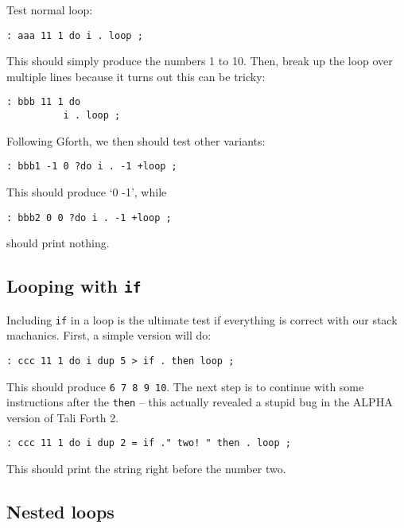 Test normal loop:
\begin{lstlisting}[frame=lines]
        : aaa 11 1 do i . loop ;        
\end{lstlisting}

\noindent This should simply produce the numbers 1 to 10. Then, break up the
loop over multiple lines because it turns out this can be tricky:

\begin{lstlisting}[frame=lines]
        : bbb 11 1 do 
          i . loop ; 
\end{lstlisting}

\noindent Following Gforth, we then should test other variants:

\begin{lstlisting}[frame=lines]
        : bbb1 -1 0 ?do i . -1 +loop ;
\end{lstlisting}

\noindent This should produce `0 -1', while

\begin{lstlisting}[frame=lines]
        : bbb2 0 0 ?do i . -1 +loop ;
\end{lstlisting}

\noindent should print nothing.

\subsection{Looping with \texttt{if}}

Including \texttt{if} in a loop is the ultimate test if everything is correct
with our stack machanics. First, a simple version will do:

\begin{lstlisting}[frame=lines]
        : ccc 11 1 do i dup 5 > if . then loop ; 
\end{lstlisting}

\noindent This should produce \texttt{6 7 8 9 10}. The next step is to continue
with some instructions after the \texttt{then} -- this actually revealed a
stupid bug in the ALPHA version of Tali Forth 2.

\begin{lstlisting}[frame=lines]
        : ccc 11 1 do i dup 2 = if ." two! " then . loop ;
\end{lstlisting}

\noindent This should print the string right before the number two.

\subsection{Nested loops}

